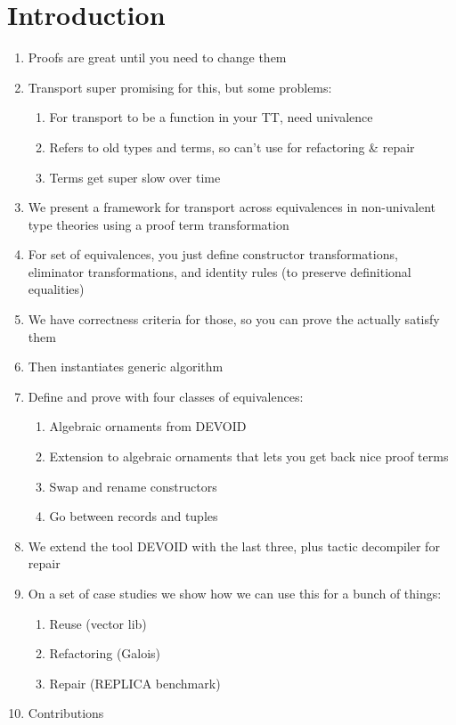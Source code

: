 \section{Introduction}

\begin{enumerate}
  \item Proofs are great until you need to change them
  \item Transport super promising for this, but some problems:
  \begin{enumerate}
    \item For transport to be a function in your TT, need univalence
    \item Refers to old types and terms, so can't use for refactoring \& repair
    \item Terms get super slow over time
  \end{enumerate}
  \item We present a framework for transport across equivalences in non-univalent type theories using a proof term transformation
  \item For set of equivalences, you just define constructor transformations, eliminator transformations, and identity rules (to preserve definitional equalities)
  \item We have correctness criteria for those, so you can prove the actually satisfy them
  \item Then instantiates generic algorithm
  \item Define and prove with four classes of equivalences:
  \begin{enumerate}
    \item Algebraic ornaments from DEVOID
    \item Extension to algebraic ornaments that lets you get back nice proof terms
    \item Swap and rename constructors
    \item Go between records and tuples
  \end{enumerate}
  \item We extend the tool DEVOID with the last three, plus tactic decompiler for repair
  \item On a set of case studies we show how we can use this for a bunch of things:
  \begin{enumerate}
    \item Reuse (vector lib)
    \item Refactoring (Galois)
    \item Repair (REPLICA benchmark)
  \end{enumerate}
  \item Contributions
\end{enumerate}
